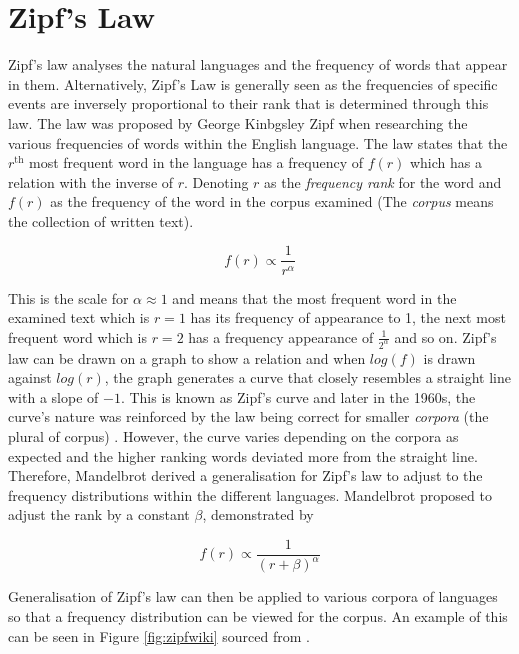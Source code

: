 \section{Zipf's Law}
Zipf's law analyses the natural languages and the frequency of words that appear in them. Alternatively, Zipf's Law \cite{hosch2009zipf} is generally seen as the frequencies of specific events are inversely proportional to their rank that is determined through this law. The law was proposed by George Kinbgsley Zipf when researching the various frequencies of words within the English language. The law states that the $r^{\text{th}}$ most frequent word in the language has a frequency of $f(r)$ which has a relation with the inverse of $r$. Denoting $r$ as the \emph{frequency rank} for the word and $f(r)$ as the frequency of the word in the corpus examined (The \emph{corpus} means the collection of written text).

\begin{equation}\label{eq:zipfs}
f(r) \propto \frac{1}{r^{\alpha}}
\end{equation}

This is the scale for $\alpha \approx 1$ and means that the most frequent word in the examined text which is $r = 1$ has its frequency of appearance to 1, the next most frequent word which is $r = 2$ has a frequency appearance of $\frac{1}{2^{\alpha}}$ and so on. Zipf's law can be drawn on a graph to show a relation and when $log(f)$ is drawn against $log(r)$, the graph generates a curve that closely resembles a straight line with a slope of $-1$. This is known as Zipf's curve and later in the 1960s, the curve's nature was reinforced by the law being correct for smaller \emph{corpora} (the plural of corpus) \cite{sicilia2002extension}. However, the curve varies depending on the corpora as expected and the higher ranking words deviated more from the straight line. Therefore, Mandelbrot derived a generalisation for Zipf's law to adjust to the frequency distributions within the different languages. Mandelbrot proposed to adjust the rank by a constant $\beta$, demonstrated by

\begin{equation}\label{eq:zipfs}
f(r) \propto \frac{1}{(r + \beta)^{\alpha}}
\end{equation}

Generalisation of Zipf's law can then be applied to various corpora of languages so that a frequency distribution can be viewed for the corpus. An example of this can be seen in Figure \ref{fig:zipfwiki} sourced from \cite{zipffigure}.

